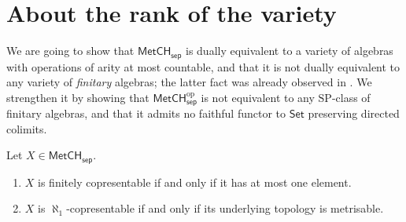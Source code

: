 \documentclass[11pt]{amsart}
\theoremstyle{definition}
\newcommand{\cat}[1]{\mathsf{#1}}
\newcommand{\op}{\mathrm{op}}
\newcommand{\MetCHsep}{\cat{MetCH_{sep}}}
\newcommand{\MetCHsepop}{\cat{MetCH}_\cat{sep}^\op}
\newcommand{\Set}{\cat{Set}}
\begin{document}
\section{About the rank of the variety}

We are going to show that $\MetCHsep$ is dually equivalent to a variety of algebras with operations of arity at most countable, and that it is not dually equivalent to any variety of \emph{finitary} algebras; the latter fact was already observed in \cite{AH25}. We strengthen it by showing that $\MetCHsepop$ is not equivalent to any $\mathrm{SP}$-class of finitary algebras, and that it admits no faithful functor to $\Set$ preserving directed colimits.

\begin{theorem} \label{t:char-copres}
  Let \(X\in\MetCHsep\).
  \begin{enumerate}
    \item \label{i:fin-copr}
    \(X\) is finitely copresentable if and only if it has at most one element.

    \item \label{i:aleph1-copr}
    \(X\) is \(\aleph_1\)-copresentable if and only if its underlying topology is metrisable.
  \end{enumerate}
\end{theorem}
\end{document}
